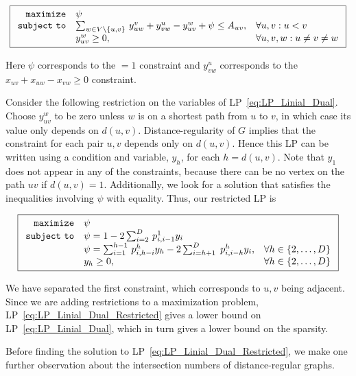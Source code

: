 \documentclass[a4paper,11pt]{article}
\theoremstyle{definition}
\begin{document}
\begin{equation}\label{eq:LP_Linial_Dual}
\boxed{
\begin{array}{rll}
{\tt maximize} & \psi \\
{\tt subject\ to} &\sum_{w \in V \setminus \{u, v\}} \,y_{uw}^v + y_{vw}^u - y_{uv}^w + \psi \leq A_{uv}, & \forall u,v : u < v\\
    &y_{uv}^w \geq 0, & \forall u,v,w : u\neq v \neq w\\
\end{array}}
\end{equation}

Here $\psi$ corresponds to the $= 1$ constraint and $y^u_{vw}$ corresponds to the $x_{uv} + x_{uw} - x_{vw} \ge 0$ constraint.

Consider the following restriction on the variables of LP~\eqref{eq:LP_Linial_Dual}. Choose $y_{uv}^w$ to be zero unless $w$ is on a shortest path from $u$ to $v$, in which case its value only depends on $d(u,v)$. Distance-regularity of $G$ implies that the constraint for each pair $u,v$ depends only on $d(u,v)$. Hence this LP can be written using a condition and variable, $y_h$, for each $h = d(u,v)$. Note that $y_1$ does not appear in any of the constraints, because there can be no vertex on the path $uv$ if $d(u,v) = 1$. Additionally, we look for a solution that satisfies the inequalities involving $\psi$ with equality. Thus, our restricted LP is

\begin{equation}\label{eq:LP_Linial_Dual_Restricted}
\boxed{
\begin{array}{rll}
{\tt maximize} & \psi \\
{\tt subject\ to} &\psi =  1 -2 \sum_{i=2}^{D} \, p_{i,i-1}^1y_i \\
&\psi =  \sum_{i=1}^{h-1} \, p_{i,h-i}^h y_h -2 \sum_{i=h+1}^{D}\;  p_{i,i-h}^h y_i, & \forall h \in \{2, \dots, D\}\\
    &y_h \geq 0, & \forall h \in \{2, \dots, D\}\\
\end{array}}
\end{equation}

We have separated the first constraint, which corresponds to $u,v$ being adjacent. Since we are adding restrictions to a maximization problem, LP~\eqref{eq:LP_Linial_Dual_Restricted} gives a lower bound on LP~\eqref{eq:LP_Linial_Dual}, which in turn gives a lower bound on the sparsity. 


Before finding the solution to LP~\eqref{eq:LP_Linial_Dual_Restricted}, we make one further observation about the intersection numbers of distance-regular graphs.
\end{document}
